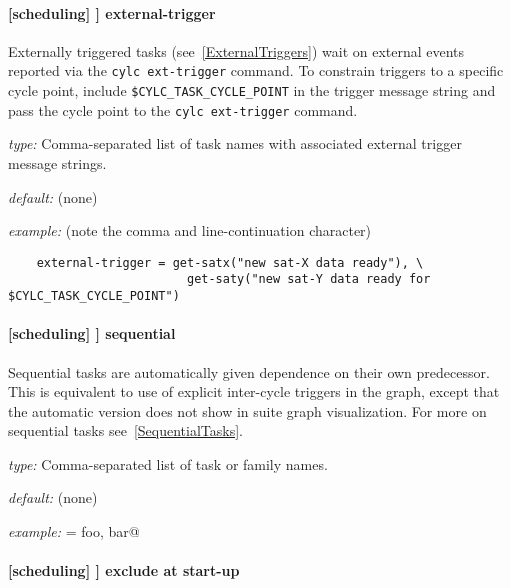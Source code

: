 \paragraph[external-trigger]{[scheduling] \textrightarrow [[special tasks]] \textrightarrow external-trigger}

Externally triggered tasks (see~\ref{ExternalTriggers}) wait on external events
reported via the \lstinline=cylc ext-trigger= command.  To constrain triggers
to a specific cycle point, include \lstinline=$CYLC_TASK_CYCLE_POINT= in the
trigger message string and pass the cycle point to the \lstinline=cylc ext-trigger= command.

\begin{myitemize}
    \item {\em type:} Comma-separated list of task names with associated
        external trigger message strings.
    \item {\em default:} (none)
    \item {\em example:} (note the comma and line-continuation character)
\begin{lstlisting}
    external-trigger = get-satx("new sat-X data ready"), \
                         get-saty("new sat-Y data ready for $CYLC_TASK_CYCLE_POINT")
\end{lstlisting}
\end{myitemize}


\paragraph[sequential]{[scheduling] \textrightarrow [[special tasks]] \textrightarrow sequential}

Sequential tasks are automatically given dependence on their own
predecessor. This is equivalent to use of explicit inter-cycle triggers
in the graph, except that the automatic version does not show in suite
graph visualization. For more on sequential tasks see~\ref{SequentialTasks}.

\begin{myitemize}
    \item {\em type:} Comma-separated list of task or family names.
    \item {\em default:} (none)
    \item {\em example:} \lstinline@sequential = foo, bar@
\end{myitemize}

\paragraph[exclude at start-up]{[scheduling] \textrightarrow [[special tasks]] \textrightarrow exclude at start-up}
\label{EASU}

